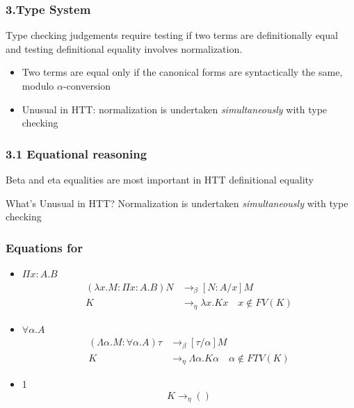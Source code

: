 \documentclass[xcolor=dvipsnames,9pt,hide notes,mathserif]{beamer}
\begin{document}
\begin{frame}
  \frametitle{3.Type System}
  Type checking judgements require testing if two terms are definitionally equal and testing definitional equality involves normalization.


    \begin{itemize}
    \item Two terms are equal only if the canonical forms are syntactically the same, modulo $\alpha$-conversion
    \item Unusual in HTT: normalization is undertaken \textit{simultaneously} with type checking 
    \end{itemize}

\end{frame}







\begin{frame}
  \frametitle{3.1 Equational reasoning}
Beta and eta equalities are most important in HTT definitional equality

What's Unusual in HTT? Normalization is undertaken \textit{simultaneously} with type checking 

\end{frame}




\begin{frame}
  \frametitle{Equations for}

    \begin{itemize}
    \item $\Pi x{:}A.B$
\begin{align*}
(\lambda x.M : \Pi x{:}A.B)N &\longrightarrow_\beta [N{:}A/x]M\\
                                         K &\longrightarrow_\eta \lambda x.K x     \quad    x \notin FV(K) 
\end{align*}
    \item $\forall \alpha.A$
\begin{align*}
(\Lambda \alpha.M : \forall \alpha. A)\tau &\longrightarrow_\beta [\tau/\alpha]M\\
                                         K &\longrightarrow_\eta \Lambda \alpha.K \alpha     \quad    \alpha \notin FTV(K) 
\end{align*}
\item 1
\[
K \longrightarrow_\eta ()
\]
    \end{itemize}

\end{frame}
\end{document}
